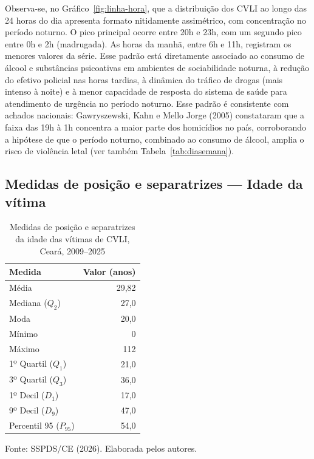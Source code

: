 \documentclass[12pt,a4paper]{article}
\newcommand{\fonte}[1]{  \vspace{-2mm}
  \begin{center}\footnotesize Fonte: #1\end{center}
}
\begin{document}
Observa-se, no Gráfico~\ref{fig:linha-hora}, que a distribuição dos CVLI ao longo das 24 horas do dia apresenta formato nitidamente assimétrico, com concentração no período noturno. O pico principal ocorre entre 20h e 23h, com um segundo pico entre 0h e 2h (madrugada). As horas da manhã, entre 6h e 11h, registram os menores valores da série. Esse padrão está diretamente associado ao consumo de álcool e substâncias psicoativas em ambientes de sociabilidade noturna, à redução do efetivo policial nas horas tardias, à dinâmica do tráfico de drogas (mais intenso à noite) e à menor capacidade de resposta do sistema de saúde para atendimento de urgência no período noturno. Esse padrão é consistente com achados nacionais: Gawryszewski, Kahn e Mello Jorge (2005) constataram que a faixa das 19h à 1h concentra a maior parte dos homicídios no país, corroborando a hipótese de que o período noturno, combinado ao consumo de álcool, amplia o risco de violência letal (ver também Tabela~\ref{tab:diasemana}).

\subsection{Medidas de posição e separatrizes --- Idade da vítima}

\begin{table}[H]
\centering
\caption{Medidas de posição e separatrizes da idade das vítimas de CVLI, Ceará, 2009--2025}
\label{tab:posicao}
\begin{tabular}{lr}
\toprule
\textbf{Medida} & \textbf{Valor (anos)} \\
\midrule
Média                       & 29,82 \\
Mediana ($Q_2$)             & 27,0  \\
Moda                        & 20,0  \\
Mínimo                      & 0     \\
Máximo                      & 112   \\
1º Quartil ($Q_1$)          & 21,0  \\
3º Quartil ($Q_3$)          & 36,0  \\
1º Decil ($D_1$)            & 17,0  \\
9º Decil ($D_9$)            & 47,0  \\
Percentil 95 ($P_{95}$)     & 54,0  \\
\bottomrule
\end{tabular}
\end{table}
\fonte{SSPDS/CE (2026). Elaborada pelos autores.}
\end{document}
